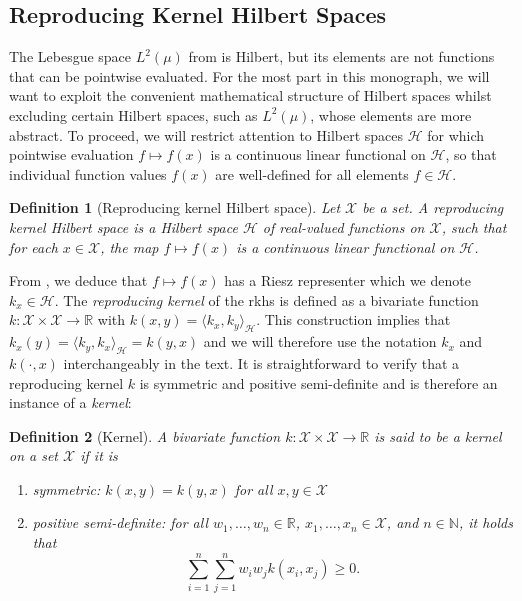 \documentclass[12pt,paper=letter]{scrreprt}
\newtheorem{definition}{Definition}[chapter]
\begin{document}
\subsection{Reproducing Kernel Hilbert Spaces}

The Lebesgue space $L^2(\mu)$ from  is Hilbert, but its elements are not functions that can be pointwise evaluated.
For the most part in this monograph, we will want to exploit the convenient mathematical structure of Hilbert spaces whilst excluding certain Hilbert spaces, such as $L^2(\mu)$, whose elements are more abstract.
To proceed, we will restrict attention to Hilbert spaces $\mathcal{H}$ for which pointwise evaluation $f \mapsto f(x)$ is a continuous linear functional on $\mathcal{H}$, so that individual function values $f(x)$ are well-defined for all elements $f \in \mathcal{H}$.


\begin{definition}[Reproducing kernel Hilbert space] \label{def: rkhs}
Let $\mathcal{X}$ be a set.
A \emph{reproducing kernel Hilbert space} is a Hilbert space $\mathcal{H}$ of real-valued functions on $\mathcal{X}$, such that for each $x \in \mathcal{X}$, the map $f \mapsto f(x)$ is a continuous linear functional on $\mathcal{H}$.
\end{definition}

From , we deduce that $f \mapsto f(x)$ has a Riesz representer which we denote $k_x \in \mathcal{H}$.
The \emph{reproducing kernel} of the \ac{rkhs} is defined as a bivariate function $k : \mathcal{X} \times \mathcal{X} \rightarrow \mathbb{R}$ with $k(x,y) = \langle k_x,k_y \rangle_{\mathcal{H}}$.
This construction implies that $k_x(y) = \langle k_y , k_x \rangle_{\mathcal{H}} = k(y,x)$ and we will therefore use the notation $k_x$ and $k(\cdot,x)$ interchangeably in the text.
It is straightforward to verify that a reproducing kernel $k$ is symmetric and positive semi-definite and is therefore an instance of a \emph{kernel}:

\begin{definition}[Kernel] \label{def: kernel}
A bivariate function $k : \mathcal{X} \times \mathcal{X} \rightarrow \mathbb{R}$ is said to be a \emph{kernel} on a set $\mathcal{X}$ if it is
\begin{enumerate}
\item \emph{symmetric:} $k(x,y) = k(y,x)$ for all $x,y \in \mathcal{X}$
\item \emph{positive semi-definite:} for all $w_1,\dots,w_n \in \mathbb{R}$, $x_1,\dots,x_n \in \mathcal{X}$, and $n \in \mathbb{N}$, it holds that 
$$
\sum_{i=1}^n \sum_{j = 1}^n w_i w_j k(x_i , x_j) \geq 0 .
$$
\end{enumerate}
\end{definition}
\end{document}
